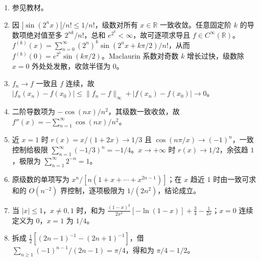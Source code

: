 \begin{enumerate}
\item 参见教材。
\item 因 $|\sin(2^nx)|/n!\le1/n!$，级数对所有 $x\in\mathbb R$ 一致收敛。任意固定阶 $k$ 的导数项绝对值至多 $2^{nk}/n!$，总和 $e^{2^k}<\infty$，故可逐项求导且 $f\in C^\infty(\mathbb R)$。$f^{(k)}(x)=\sum_{n=0}^\infty(2^n)^k\sin(2^nx+k\pi/2)/n!$，从而 $f^{(k)}(0)=e^{2^k}\sin(k\pi/2)$。Maclaurin 系数对奇数 $k$ 增长过快，级数除 $x=0$ 外处处发散，收敛半径为 $0$。
\item $f_n\to f$ 一致且 $f$ 连续，故 $|f_n(x_n)-f(x_0)|\le\lVert{}f_n-f\rVert_\infty+|f(x_n)-f(x_0)|\to0$。
\item 二阶导数项为 $-\cos(nx)/n^2$，其级数一致收敛，故 $f''(x)=-\sum_{n=1}^\infty\cos(nx)/n^2$。
\item 近 $x=1$ 时 $r(x)=x/(1+2x)\to1/3$ 且 $\cos(n\pi/x)\to(-1)^n$，一致控制给极限 $\sum_{n=1}^\infty(-1/3)^n=-1/4$。$x\to+\infty$ 时 $r(x)\to1/2$，余弦趋 $1$，极限为 $\sum_{n=1}^\infty2^{-n}=1$。
\item 原级数的单项写为 $x^n/[n(1+x+\cdots+x^{2n-1})]$；在 $x$ 趋近 $1$ 时由一致可求和的 $O(n^{-2})$ 界控制，逐项极限为 $1/(2n^2)$，结论成立。
\item 当 $|x|\le1$，$x\ne0,1$ 时，和为 $\frac{(1-x)^2}{2x^2}[-\ln(1-x)]+\frac34-\frac1{2x}$；$x=0$ 连续定义为 $0$，$x=1$ 为 $1/4$。
\item 拆成 $\frac12[(2n-1)^{-1}-(2n+1)^{-1}]$，借 $\sum_{n\ge1}(-1)^{n-1}/(2n-1)=\pi/4$，得和为 $\pi/4-1/2$。
\end{enumerate}
